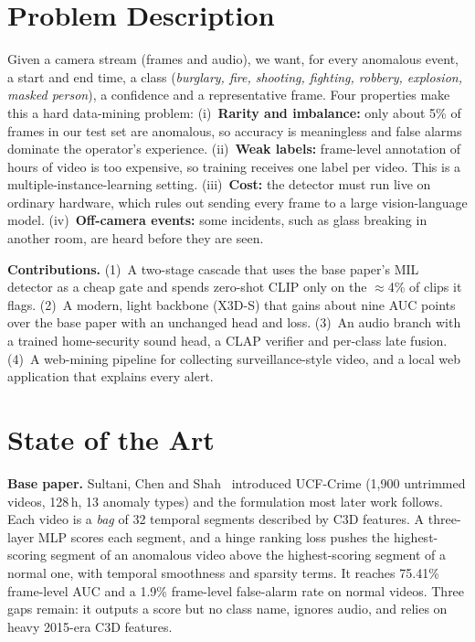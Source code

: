 \documentclass[conference,a4paper]{IEEEtran}
\begin{document}
\section{Problem Description}
Given a camera stream (frames and audio), we want, for every anomalous event, a start and end time, a class
(\emph{burglary, fire, shooting, fighting, robbery, explosion, masked person}), a confidence and a representative
frame. Four properties make this a hard data-mining problem:
(i)~\textbf{Rarity and imbalance:} only about 5\% of frames in our test set are anomalous, so accuracy is
meaningless and false alarms dominate the operator's experience.
(ii)~\textbf{Weak labels:} frame-level annotation of hours of video is too expensive, so training receives one
label per video. This is a multiple-instance-learning setting.
(iii)~\textbf{Cost:} the detector must run live on ordinary hardware, which rules out sending every frame to a large
vision-language model.
(iv)~\textbf{Off-camera events:} some incidents, such as glass breaking in another room, are heard before they are seen.

\textbf{Contributions.} (1)~A two-stage cascade that uses the base paper's MIL detector as a cheap gate and spends
zero-shot CLIP only on the $\approx$4\% of clips it flags. (2)~A modern, light backbone (X3D-S) that gains about
nine AUC points over the base paper with an unchanged head and loss. (3)~An audio branch with a trained
home-security sound head, a CLAP verifier and per-class late fusion. (4)~A web-mining pipeline for collecting
surveillance-style video, and a local web application that explains every alert.

\section{State of the Art}
\textbf{Base paper.} Sultani, Chen and Shah~\cite{sultani} introduced UCF-Crime (1{,}900 untrimmed videos,
128\,h, 13 anomaly types) and the formulation most later work follows. Each video is a \emph{bag} of 32 temporal
segments described by C3D features. A three-layer MLP scores each segment, and a hinge ranking loss pushes the
highest-scoring segment of an anomalous video above the highest-scoring segment of a normal one, with temporal
smoothness and sparsity terms. It reaches 75.41\% frame-level AUC and a 1.9\% frame-level false-alarm rate on
normal videos. Three gaps remain: it outputs a score but no class name, ignores audio, and relies on heavy
2015-era C3D features.
\end{document}
